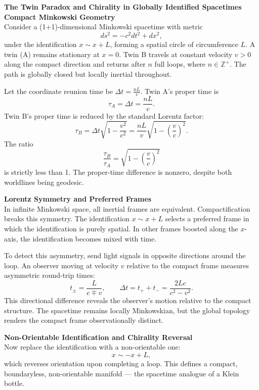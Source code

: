 \begin{technical}
{\Large\textbf{The Twin Paradox and Chirality in Globally Identified Spacetimes}}\\[0.7em]

\vspace{0.5em}
\noindent\textbf{Compact Minkowski Geometry}\\[0.5em]
Consider a (1+1)-dimensional Minkowski spacetime with metric
\[
ds^2 = -c^2 dt^2 + dx^2,
\]
under the identification \(x \sim x + L\), forming a spatial circle of circumference \(L\). A twin (A) remains stationary at \(x = 0\). Twin B travels at constant velocity \(v > 0\) along the compact direction and returns after $n$ full loops, where \(n \in \mathbb{Z}^+\). The path is globally closed but locally inertial throughout.

Let the coordinate reunion time be \(\Delta t = \frac{nL}{v}\). Twin A’s proper time is
\[
\tau_A = \Delta t = \frac{nL}{v}.
\]
Twin B’s proper time is reduced by the standard Lorentz factor:
\[
\tau_B = \Delta t \sqrt{1 - \frac{v^2}{c^2}} = \frac{nL}{v} \sqrt{1 - \left( \frac{v}{c} \right)^2 }.
\]
The ratio
\[
\frac{\tau_B}{\tau_A} = \sqrt{1 - \left( \frac{v}{c} \right)^2 }
\]
is strictly less than 1. The proper-time difference is nonzero, despite both worldlines being geodesic.

\vspace{0.5em}
\noindent\textbf{Lorentz Symmetry and Preferred Frames}\\[0.5em]
In infinite Minkowski space, all inertial frames are equivalent. Compactification breaks this symmetry. The identification \(x \sim x + L\) selects a preferred frame in which the identification is purely spatial. In other frames boosted along the $x$-axis, the identification becomes mixed with time.

To detect this asymmetry, send light signals in opposite directions around the loop. An observer moving at velocity \(v\) relative to the compact frame measures asymmetric round-trip times:
\[
t_{\pm} = \frac{L}{c \mp v}, \qquad \Delta t = t_+ + t_- = \frac{2Lc}{c^2 - v^2}.
\]
This directional difference reveals the observer’s motion relative to the compact structure. The spacetime remains locally Minkowskian, but the global topology renders the compact frame observationally distinct.

\vspace{0.5em}
\noindent\textbf{Non-Orientable Identification and Chirality Reversal}\\[0.5em]
Now replace the identification with a non-orientable one:
\[
x \sim -x + L,
\]
which reverses orientation upon completing a loop. This defines a compact, boundaryless, non-orientable manifold — the spacetime analogue of a Klein bottle.


\end{technical}

